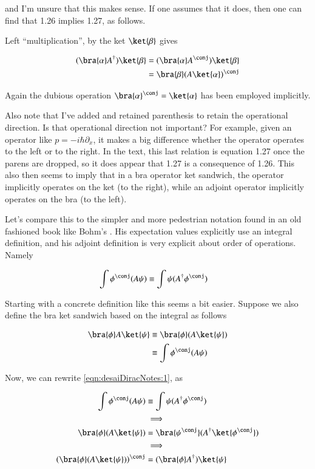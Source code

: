 and I'm unsure that this makes sense.  If one assumes that it does, then one can find that 1.26 implies 1.27, as follows.

Left ``multiplication'', by the ket $\ket{\beta}$ gives

\begin{align*}
(\bra{\alpha} A^\dagger) \ket{\beta} &= (\bra{\alpha} A^\conj) \ket{\beta} \\
&= {\bra{\beta} (A \ket{\alpha})}^\conj 
\end{align*}

Again the dubious operation $\bra{\alpha}^\conj = \ket{\alpha}$ has been employed implicitly.

Also note that I've added and retained parenthesis to retain the operational direction.  Is that operational direction not important?  For example, given an operator like $p = -i \hbar \partial_x$, it makes a big difference whether the operator operates to the left or to the right.  In the text, this last relation is equation 1.27 once the parens are dropped, so it does appear that 1.27 is a consequence of 1.26.  This also then seems to imply that in a bra operator ket sandwich, the operator implicitly operates on the ket (to the right), while an adjoint operator implicitly operates on the bra (to the left).

Let's compare this to the simpler and more pedestrian notation found in an old fashioned book like Bohm's \citep{bohm1989qt}.  His expectation values explicitly use an integral definition, and his adjoint definition is very explicit about order of operations.  Namely

\begin{align}\label{eqn:desaiDiracNotes:1}
\int \phi^\conj (A \psi) 
&\equiv \int \psi (A^\dagger \phi^\conj) 
\end{align}

Starting with a concrete definition like this seems a bit easier.  Suppose we also define the bra ket sandwich based on the integral as follows

\begin{align*}
\bra{\phi} A \ket{\psi} 
&\equiv \bra{\phi} (A \ket{\psi}) \\
&\equiv \int \phi^\conj (A \psi) \\
\end{align*}

Now, we can rewrite \ref{eqn:desaiDiracNotes:1}, as 

\begin{align*}
\int \phi^\conj (A \psi)   &\equiv \int \psi (A^\dagger \phi^\conj) \\
&\implies \\
\bra{\phi} (A \ket{\psi})  &= \bra{\psi^\conj} ( A^\dagger \ket{\phi^\conj} ) \\
&\implies \\
\left(\bra{\phi} (A \ket{\psi}) \right)^\conj  &= ( \bra{\phi} A^\dagger ) \ket{\psi}
\end{align*}

